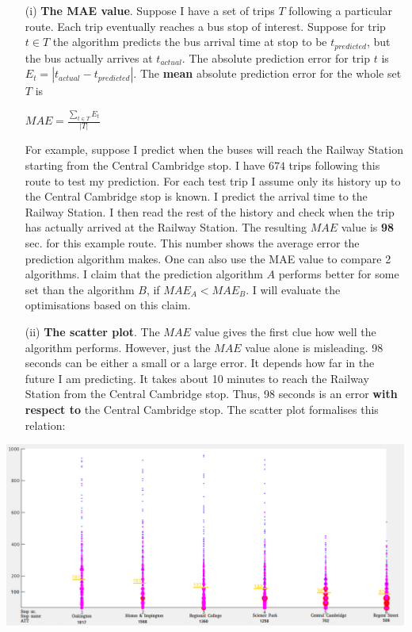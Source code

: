 \documentclass[12pt,a4paper,oneside,openright]{report}
\begin{document}
\begin{enumerate}
\item[(i)]
    \textbf{The MAE value}. Suppose I have a set
    of trips $T$ following a particular route. Each trip eventually reaches a bus stop of interest. 
    Suppose for trip $t \in T$ the algorithm predicts the bus arrival time
    at stop to be $t_{predicted}$, but the bus actually arrives at $t_{actual}$.
    The absolute prediction error for trip $t$ is
    $E_t = |t_{actual} - t_{predicted}|$. The \textbf{mean} absolute prediction
    error for the whole set $T$ is

    \begin{center}
        $MAE = \frac{\sum\nolimits_{t \in {T}}{E_t}}{|T|}$
    \end{center}

    For example, suppose I predict when the buses will reach the Railway Station
    starting from the Central Cambridge stop. I have $674$ trips
    following this route to test my prediction. For each test trip I assume
    only its history up to the Central Cambridge stop is known. I predict
    the arrival time to the Railway Station. I then read the rest of the history and
    check when the trip has actually arrived at the Railway Station.
    The resulting $MAE$ value is \textbf{98} sec. for this example route. This number shows
    the average error the prediction algorithm makes. One can also use the MAE value to compare
    2 algorithms. I claim that the prediction algorithm $A$ performs better
    for some set than the algorithm $B$, if $MAE_A < MAE_B$. I will evaluate the optimisations based
    on this claim.

\item[(ii)] \textbf{The scatter plot}. The $MAE$ value gives the first
   clue how well the algorithm performs. However, just the $MAE$ value
   alone is misleading. 98 seconds can be either a small or a large
   error. It depends how far in the future I am predicting. It takes about 10 
   minutes to reach the Railway Station from the Central Cambridge stop. Thus,
   98 seconds is an error \textbf{with respect to} the Central Cambridge stop. 
   The scatter plot formalises this relation:


\end{enumerate}

\includegraphics[width=\textwidth]{figs/scatter_plot.png} \\
\end{document}
